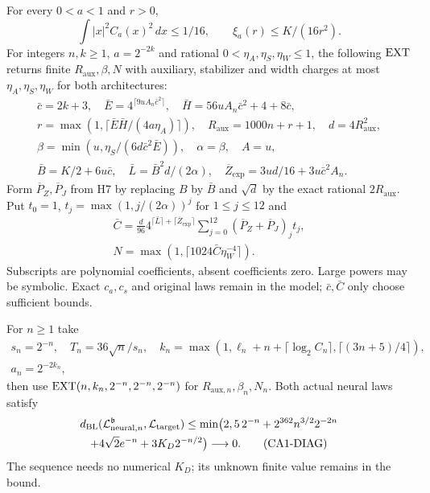 \begin{proposition}\label{cm:EXT}
For every $0<a<1$ and $r>0$,
\begin{equation}
 \int|x|^2C_a(x)^2\,dx\le1/16,\qquad
 \xi_a(r)\le K/(16r^2).\tag{CA1-TAIL}\label{cm:tail}
\end{equation}
For integers $n,k\ge1$, $a=2^{-2k}$ and rational
$0<\eta_A,\eta_S,\eta_W\le1$, the following $\operatorname{EXT}$ returns finite
$R_{\mathrm{aux}},\beta,N$ with auxiliary, stabilizer and width charges
at most $\eta_A,\eta_S,\eta_W$ for both architectures:
\begin{gather*}
 \bar c=2k+3,\quad\bar E=4^{\lceil9uA_n\bar c^2\rceil},\quad
 \bar H=56uA_n\bar c^2+4+8\bar c,\\
 r=\max(1,\lceil\bar E\bar H/(4a\eta_A)\rceil),\quad
 R_{\mathrm{aux}}=1000n+r+1,\quad d=4R_{\mathrm{aux}}^2,\\
 \beta=\min(u,\eta_S/(6d\bar c^2\bar E)),\quad\alpha=\beta,\quad A=u,\\
 \bar B=K/2+6u\bar c,\quad\bar L=\bar B^2d/(2\alpha),\quad
 \overline Z_{\exp}=3ud/16+3u\bar c^2A_n.
\end{gather*}
Form $\overline P_Z,\overline P_J$ from H7 by replacing $B$ by $\bar B$
and $\sqrt d$ by the exact rational $2R_{\mathrm{aux}}$. Put $t_0=1$,
$t_j=\max(1,j/(2\alpha))^j$ for $1\le j\le12$ and
\begin{gather*}
 \bar C=\frac d{96}4^{\lceil\bar L\rceil+\lceil\overline Z_{\exp}\rceil}
          \sum_{j=0}^{12}(\overline P_Z+\overline P_J)_j t_j,\\
 N=\max(1,\lceil1024\bar C\eta_W^{-4}\rceil).
 \tag{EXT}\label{cm:EXT-formula}
\end{gather*}
Subscripts are polynomial coefficients, absent coefficients zero.
Large powers may be symbolic. Exact $c_a,c_s$ and original laws remain
in the model; $\bar c,\bar C$ only choose sufficient bounds.
\end{proposition}

\begin{theorem}\label{cm:diagonal}
For $n\ge1$ take
\begin{gather*}
 s_n=2^{-n},\quad T_n=36\sqrt n/s_n,\quad
 k_n=\max(1,\ell_n+n+\lceil\log_2C_n\rceil,\lceil(3n+5)/4\rceil),\\
 a_n=2^{-2k_n},
\end{gather*}
then use $\operatorname{EXT}(n,k_n,2^{-n},2^{-n},2^{-n})$ for
$R_{\mathrm{aux},n},\beta_n,N_n$. Both actual neural laws satisfy
\begin{multline}
 d_{\mathrm{BL}}(\mathcal L_{\mathrm{neural},n}^{\mathfrak b},\mathcal L_{\mathrm{target}})
 \le\min\bigl(2,5\,2^{-n}+2^{362}n^{3/2}2^{-2n}\\
            +4\sqrt2e^{-n}+3K_D2^{-n/2}\bigr)\longrightarrow0 .
 \tag{CA1-DIAG}\label{cm:diagonal-bound}
\end{multline}
The sequence needs no numerical $K_D$; its unknown finite value remains
in the bound.
\end{theorem}

